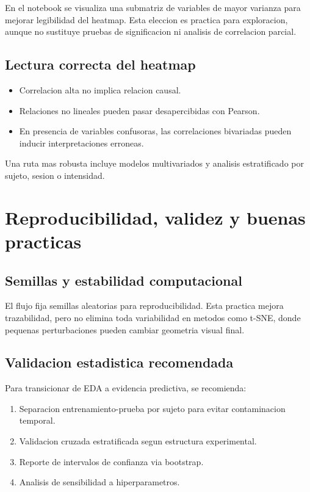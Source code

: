 \documentclass[12pt,a4paper,oneside]{report}
\begin{document}
En el notebook se visualiza una submatriz de variables de mayor varianza para mejorar legibilidad del heatmap. Esta eleccion es practica para exploracion, aunque no sustituye pruebas de significacion ni analisis de correlacion parcial.

\section{Lectura correcta del heatmap}

\begin{itemize}
\item Correlacion alta no implica relacion causal.
\item Relaciones no lineales pueden pasar desapercibidas con Pearson.
\item En presencia de variables confusoras, las correlaciones bivariadas pueden inducir interpretaciones erroneas.
\end{itemize}

Una ruta mas robusta incluye modelos multivariados y analisis estratificado por sujeto, sesion o intensidad.

\chapter{Reproducibilidad, validez y buenas practicas}

\section{Semillas y estabilidad computacional}

El flujo fija semillas aleatorias para reproducibilidad. Esta practica mejora trazabilidad, pero no elimina toda variabilidad en metodos como t-SNE, donde pequenas perturbaciones pueden cambiar geometria visual final.

\section{Validacion estadistica recomendada}

Para transicionar de EDA a evidencia predictiva, se recomienda:
\begin{enumerate}
\item Separacion entrenamiento-prueba por sujeto para evitar contaminacion temporal.
\item Validacion cruzada estratificada segun estructura experimental.
\item Reporte de intervalos de confianza via bootstrap.
\item Analisis de sensibilidad a hiperparametros.
\end{enumerate}
\end{document}
